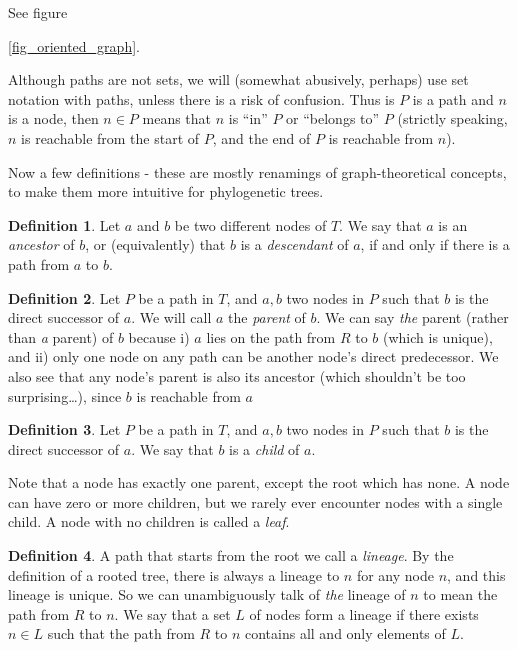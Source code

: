 \documentclass[a4paper,10pt]{report}
\theoremstyle{definition}
\newtheorem{dfn}{Definition}
\begin{document}
See figure {\ref{fig_oriented_graph}.

Although paths are not sets, we will (somewhat abusively, perhaps) use set notation with paths, unless there is a risk of confusion. Thus is $P$ is a path and $n$ is a node, then $n \in P$ means that $n$ is ``in'' $P$  or ``belongs to'' $P$ (strictly speaking, $n$ is reachable from the start of $P$, and the end of $P$ is reachable from $n$).

Now a few definitions - these are mostly renamings of graph-theoretical concepts, to make them more intuitive for phylogenetic trees. 

\begin{dfn}
\label{def_ancestor}
Let $a$ and $b$ be two different nodes of $T$. We say that $a$ is an \textit{ancestor} of $b$, or (equivalently) that $b$ is a \textit{descendant} of $a$, if and only if there is a path from $a$ to $b$. 
\end{dfn}

\begin{dfn}
\label{def_parent}
Let $P$ be a path in $T$, and $a, b$ two nodes in $P$ such that $b$ is the direct successor of $a$. We will call $a$ the \textit{parent} of $b$. We can say \textit{the} parent (rather than \textit{a} parent) of $b$ because i) $a$ lies on the path from $R$ to $b$ (which is unique), and ii) only one node on any path can be another node's direct predecessor. We also see that any node's parent is also its ancestor (which shouldn't be too surprising\ldots), since $b$ is reachable from $a$
\end{dfn}

\begin{dfn}
\label{def_child}
Let $P$ be a path in $T$, and $a, b$ two nodes in $P$ such that $b$ is the direct successor of $a$. We say that $b$ is a \textit{child} of $a$.
\end{dfn}

Note that a node has exactly one parent, except the root which has none. A node can have zero or more children, but we rarely ever encounter nodes with a single child. A node with no children is called a \textit{leaf}.

\begin{dfn}
\label{def_lineage}
A path that starts from the root we call a \emph{lineage}. By the definition of a rooted tree, there is always a lineage to $n$ for any node $n$, and this lineage is unique. So we can unambiguously talk of \textit{the} lineage of $n$ to mean the path from $R$ to $n$. We say that a set $L$ of nodes form a lineage if there exists $n \in L$ such that the path from $R$ to $n$ contains all and only elements of $L$.
\end{dfn}

}
\end{document}
